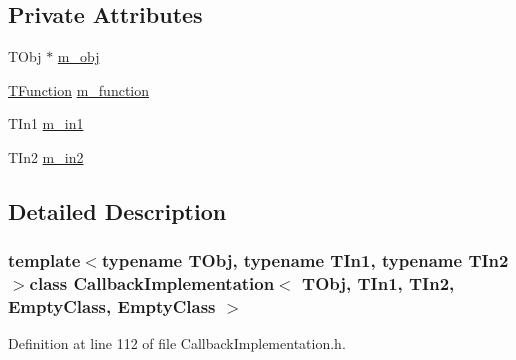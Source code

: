 \subsection*{Private Attributes}
\begin{DoxyCompactItemize}
\item 
T\-Obj $\ast$ \hyperlink{class_callback_implementation_3_01_t_obj_00_01_t_in1_00_01_t_in2_00_01_empty_class_00_01_empty_class_01_4_a08d3ffaab2b31e3e830a5b0d2ff62d00}{m\-\_\-obj}
\item 
\hyperlink{class_callback_implementation_3_01_t_obj_00_01_t_in1_00_01_t_in2_00_01_empty_class_00_01_empty_class_01_4_a972b47fde4d24656f515cb8f1b974376}{T\-Function} \hyperlink{class_callback_implementation_3_01_t_obj_00_01_t_in1_00_01_t_in2_00_01_empty_class_00_01_empty_class_01_4_a6410bb63391988a578b4784efb876301}{m\-\_\-function}
\item 
T\-In1 \hyperlink{class_callback_implementation_3_01_t_obj_00_01_t_in1_00_01_t_in2_00_01_empty_class_00_01_empty_class_01_4_a01a0c37f52b6e1fa4cdfbd9292ad4a49}{m\-\_\-in1}
\item 
T\-In2 \hyperlink{class_callback_implementation_3_01_t_obj_00_01_t_in1_00_01_t_in2_00_01_empty_class_00_01_empty_class_01_4_a8031ffbf7b37baaf1f9016b6429c1c0c}{m\-\_\-in2}
\end{DoxyCompactItemize}


\subsection{Detailed Description}
\subsubsection*{template$<$typename T\-Obj, typename T\-In1, typename T\-In2$>$class Callback\-Implementation$<$ T\-Obj, T\-In1, T\-In2, Empty\-Class, Empty\-Class $>$}



Definition at line 112 of file Callback\-Implementation.\-h.



